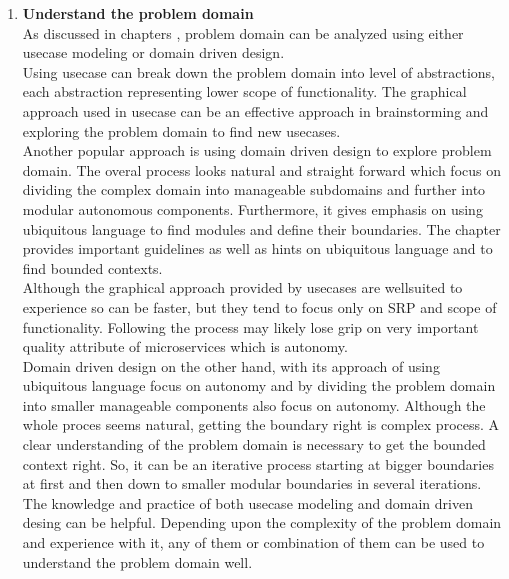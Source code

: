 \begin{enumerate}
\begin{enumerate}
\item \textbf{Understand the problem domain}\\
As discussed in chapters , problem domain can be analyzed using either usecase modeling or domain driven design. \\
Using usecase can break down the problem domain into level of abstractions, each abstraction representing lower scope of functionality. The graphical approach used in usecase can be an effective approach in brainstorming and exploring the problem domain to find new usecases.\\
Another popular approach is using domain driven design to explore problem domain. The overal process looks natural and straight forward which focus on dividing the complex domain into manageable subdomains and further into modular autonomous components. Furthermore, it gives emphasis on using ubiquitous language to find modules and define their boundaries. The chapter provides important guidelines as well as hints on ubiquitous language and to find bounded contexts.\\
Although the graphical approach provided by usecases are wellsuited to experience so can be faster, but they tend to focus only on \acrshort{SRP} and scope of functionality. Following the process may likely lose grip on very important quality attribute of microservices which is autonomy.\\
Domain driven design on the other hand, with its approach of using ubiquitous language focus on autonomy and by dividing the problem domain into smaller manageable components also focus on autonomy. Although the whole proces seems natural, getting the boundary right is complex process. A clear understanding of the problem domain is necessary to get the bounded context right. So, it can be an iterative process starting at bigger boundaries at first and then down to smaller modular boundaries in several iterations.\\
The knowledge and practice of both usecase modeling and domain driven desing can be helpful. Depending upon the complexity of the problem domain and experience with it, any of them or combination of them can be used to understand the problem domain well.


\end{enumerate}
\end{enumerate}
